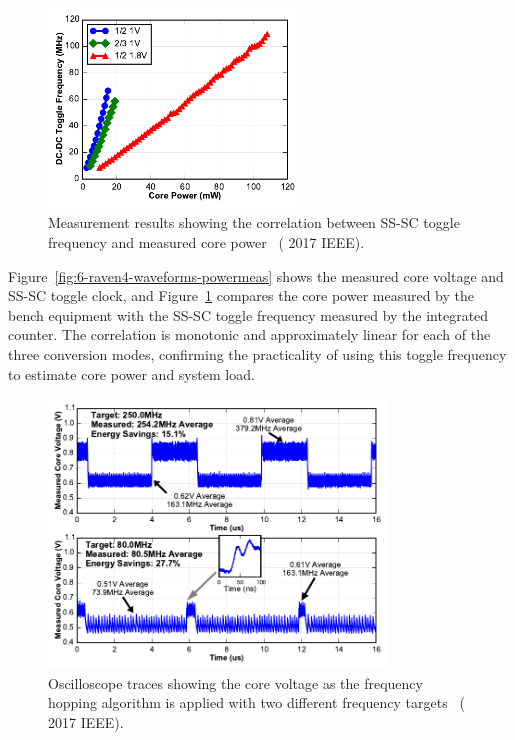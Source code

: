 \documentclass[graybox]{svmult}
\begin{document}
\begin{figure}
  \centering
  \includegraphics[width=0.6\textwidth]{6-raven4-powermeas}
  \caption{Measurement results showing the correlation between SS-SC toggle frequency and measured core power~\cite{Keller2017} ({\textcopyright} 2017 IEEE).}
  \label{fig:6-raven4-powermeas}
\end{figure}

Figure~\ref{fig:6-raven4-waveforms-powermeas} shows the measured core voltage and SS-SC toggle clock, and Figure~\ref{fig:6-raven4-powermeas} compares the core power measured by the bench equipment with the SS-SC toggle frequency measured by the integrated counter.
The correlation is monotonic and approximately linear for each of the three conversion modes, confirming the practicality of using this toggle frequency to estimate core power and system load.

\begin{figure}
  \centering
  \includegraphics[width=0.8\textwidth]{6-raven4-freqhopping}
  \caption{Oscilloscope traces showing the core voltage as the frequency hopping algorithm is applied with two different frequency targets~\cite{Keller2017} ({\textcopyright} 2017 IEEE).}
  \label{fig:6-raven4-freqhopping}
\end{figure}
\end{document}
